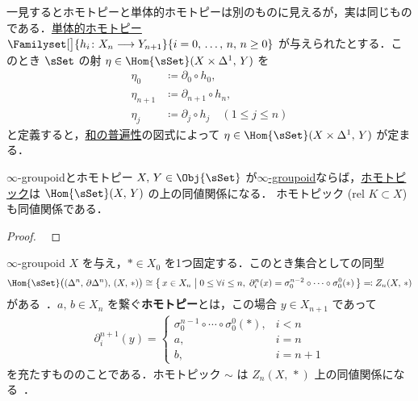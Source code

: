 \documentclass[TQFT_main]{subfiles}
\begin{document}
一見するとホモトピーと単体的ホモトピーは別のものに見えるが，実は同じものである．\hyperref[def:SimpSet-homotopic]{単体的ホモトピー} $\Familyset[\big]{h_i \colon X_n \lto Y_{n+1}}{i = 0,\, \dots,\, n,\, n \ge 0}$ が与えられたとする．このとき $\sSet$ の射 $\eta \in \Hom{\sSet}(X \times \Delta^1,\, Y)$ を
\begin{align}
    \eta_0 &\coloneqq \partial_0 \circ h_0, \\
    \eta_{n+1} &\coloneqq \partial_{n+1} \circ h_n, \\
    \eta_j &\coloneqq \partial_j \circ h_{j} \quad (1\le j \le n)
\end{align}
と定義すると，\hyperref[def:colim]{和の普遍性}の図式によって $\eta \in \Hom{\sSet}(X \times \Delta^1,\, Y)$ が定まる．

\begin{myprop}[label=prop:simphomotopy-equiv]{$\infty$-groupoidとホモトピー}
    $X,\, Y \in \Obj{\sSet}$ が\hyperref[def:infinity-1]{$\infty$-groupoid}ならば，\hyperref[def:SimpSet-homotopic]{ホモトピック}は $\Hom{\sSet} (X,\, Y)$ の上の同値関係になる．
    ホモトピック (rel $K \subset X$) も同値関係である．
\end{myprop}

\begin{proof}
    ~\cite[p.26, COROLLARY 6.2]{goerss2009simplicial}
\end{proof}

$\infty$-groupoid $X$ を与え，$* \in X_0$ を1つ固定する．このとき集合としての同型
\begin{align}
    \Hom{\sSet} \bigl( (\Delta^n,\, \partial\Delta^n),\, (X,\, *) \bigr) \cong \bigl\{\, x \in X_n \bigm|  0 \le \forall i \le n,\; \partial^n_i(x) = \sigma^{n-2}_0 \circ \cdots \circ \sigma^0_0 (*) \,\bigr\} \eqqcolon Z_n (X,\, *)
\end{align}
がある~\cite{SChen2024anomaly}．$a,\, b \in X_n$ を繋ぐ\textbf{ホモトピー}とは，この場合 $y \in X_{n+1}$ であって
\begin{align}
    \partial_i^{n+1} (y) =
    \begin{cases}
        \sigma^{n-1}_0 \circ \cdots \circ \sigma^0_0 (*), &i < n \\
        a, &i=n \\
        b, &i=n+1
    \end{cases}    
\end{align}
を充たすもののことである．ホモトピック $\sim$ は $Z_n(X,\, *)$ 上の同値関係になる~\cite[p.27, Lemma 3.28]{SChen2024anomaly}．
\end{document}
